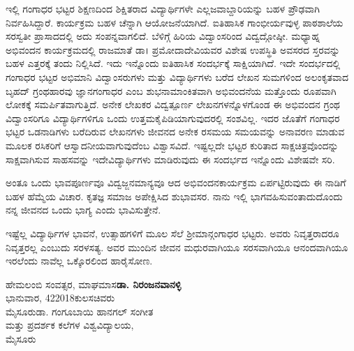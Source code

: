 {ಇಲ್ಲಿ ಗಂಗಾಧರ ಭಟ್ಟರ ಶಿಕ್ಷಣದಿಂದ ಶಿಕ್ಷಿತರಾದ ವಿದ್ಯಾರ್ಥಿಗಳೇ ಎಲ್ಲ\break ಜವಾಬ್ದಾರಿಯನ್ನು ಬಹಳ ಪ್ರೌಢವಾಗಿ ನಿರ್ವಹಿಸಿದ್ದಾರೆ. ಕಾರ್ಯಕ್ರಮ ಬಹಳ ಚೆನ್ನಾಗಿ ಆಯೋಜನೆಯಾಗಿದೆ. ಐತಿಹಾಸಿಕ ಗಾಂಭೀರ್ಯವುಳ್ಳ ಪಾಠಶಾಲೆಯ ಸರಸ್ವತೀ ಪ್ರಾಸಾದದಲ್ಲಿ ಅದು ಸಂಪನ್ನವಾಗಲಿದೆ. ಬೆಳಿಗ್ಗೆ ಹಿರಿಯ ವಿದ್ವಾಂಸರಿಂದ ವಿದ್ವದ್ಗೋಷ್ಠೀ.  ಮಧ್ಯಾಹ್ನ ಅಭಿವಂದನ ಕಾರ್ಯಕ್ರಮದಲ್ಲಿ ರಾಜಮಾತೆ ಡಾ। ಪ್ರಮೋದಾ\break ದೇವಿಯವರ ವಿಶೇಷ ಉಪಸ್ಥಿತಿ ಅವಸರದ ಸ್ತರವನ್ನು ಬಹಳ ಎತ್ತರಕ್ಕೆ ತಂದು ನಿಲ್ಲಿಸಿದೆ. ಇದು ಇನ್ನೊಂದು ಐತಿಹಾಸಿಕ ಸಂದರ್ಭಕ್ಕೆ ಸಾಕ್ಷಿಯಾಗಿದೆ. ಇದೇ ಸಂದರ್ಭದಲ್ಲಿ ಗಂಗಾಧರ ಭಟ್ಟರ ಅಭಿಮಾನಿ ವಿದ್ವಾಂಸರುಗಳು ಮತ್ತು ವಿದ್ಯಾರ್ಥಿಗಳು ಬರೆದ ಲೇಖನ ಸುಮಗಳಿಂದ ಅಲಂಕೃತವಾದ ಬೃಹದ್ ಗ್ರಂಥಹಾರವು ಜ್ಞಾನಗಂಗಾಧರ ಎಂಬ ಶುಭನಾಮಾಂಕಿತವಾಗಿ ಅಭಿವಂದನೆಯ ಮತ್ತೊಂದು ರೂಪವಾಗಿ ಲೋಕಕ್ಕೆ ಸಮರ್ಪಿತವಾಗುತ್ತಿದೆ. ಅನೇಕ ಲೇಖಕರ ವಿದ್ವತ್ಪೂರ್ಣ ಲೇಖನಗಳನ್ನೊಳಗೊಂಡ ಈ ಅಭಿವಂದನ ಗ್ರಂಥ ವಿದ್ವಾಂಸರಿಗೂ ವಿದ್ಯಾರ್ಥಿಗಳಿಗೂ ಒಂದು ಉತ್ತಮ\break ಕೈಪಿಡಿಯಾಗುವುದರಲ್ಲಿ ಸಂಶವಿಲ್ಲ. ಇದರ ಜೊತೆಗೆ ಗಂಗಾಧರ ಭಟ್ಟರ ಒಡನಾಡಿಗಳು ಬರೆದಿರುವ ಲೇಖನಗಳು ಜೀವನದ ಅನೇಕ ರಸಮಯ \enginline{ -} ಸಮಯವನ್ನು ಅನಾವರಣ ಮಾಡುವ ಮೂಲಕ ರಸಿಕರಿಗೆ ಆಸ್ವಾದನೀಯ\-ವಾಗುವುದೆಂಬ ವಿಶ್ವಾಸವಿದೆ. ಇಷ್ಟಲ್ಲದೇ ಭಟ್ಟರ ಕುರಿತಾದ ಸಾಕ್ಷಚಿತ್ರವೊಂದನ್ನು ಸಾಕ್ಷವಾಗಿಸುವ ಸಾಹಸವನ್ನು ಇದೇ\break ವಿದ್ಯಾರ್ಥಿಗಳು ಮಾಡಿರುವುದು ಈ ಸಂದರ್ಭದ ಇನ್ನೊಂದು ವಿಶೇಷವೇ ಸರಿ. 

ಅಂತೂ ಒಂದು ಭಾವಪೂರ್ಣವೂ ವಿದ್ವಜ್ಜನಮಾನ್ಯವೂ ಆದ ಅಭಿವಂದನ\break ಕಾರ್ಯಕ್ರಮ ಏರ್ಪಟ್ಟಿರುವುದು ಈ ನಾಡಿಗೆ ಬಹಳ ಹೆಮ್ಮೆಯ ವಿಚಾರ. ಕೃತಜ್ಞ ಸಮಾಜ ಅಪೇಕ್ಷಿಸಿದ ಶುಭಾವಸರ. ನಾನು ಇಲ್ಲಿ ಭಾಗವಹಿಸುವಂತಾದುದೊಂದು ನನ್ನ ಜೀವನದ ಒಂದು ಭಾಗ್ಯ ಎಂದು ಭಾವಿಸುತ್ತೇನೆ.

ಇಷ್ಟೆಲ್ಲ ವಿದ್ಯಾರ್ಥಿಗಳ ಭಾವನೆ, ಉತ್ಸಾಹಗಳಿಗೆ ಮೂಲ ಸೆಲೆ ಶ್ರೀಮಾನ್\break ಗಂಗಾಧರ ಭಟ್ಟರು. ಅವರು ನಿವೃತ್ತರಾದರೂ ನಿವೃತ್ತರಲ್ಲ ಎಂಬುದು ಸರಳಸತ್ಯ. ಅವರ ಮುಂದಿನ ಜೀವನ ಮಧುರವಾಗಿಯೂ ಸರಸವಾಗಿಯೂ ಆನಂದವಾಗಿಯೂ  ಇರಲೆಂದು ನಾವೆಲ್ಲ ಒಕ್ಕೊರಲಿಂದ ಹಾರೈಸೋಣ.
\bigskip

\noindent
ಹೇಮಲಂಬಿ ಸಂವತ್ಸರ, ಮಾಘಮಾಸ\hfill \textbf{ಡಾ. ನಿರಂಜನವಾನಳ್ಳಿ}\\
ಭಾನುವಾರ, 4\eng{-}2\eng{-}2018\hfill ಕುಲಸಚಿವರು\\
ಮೈಸೂರು\hfill ಡಾ. ಗಂಗೂಬಾಯಿ ಹಾನಗಲ್ ಸಂಗೀತ \\
\phantom{i}\hfill ಮತ್ತು ಪ್ರದರ್ಶಕ ಕಲೆಗಳ ವಿಶ್ವವಿದ್ಯಾಲಯ,\\
\phantom{i}\hfill ಮೈಸೂರು

\articleend}
